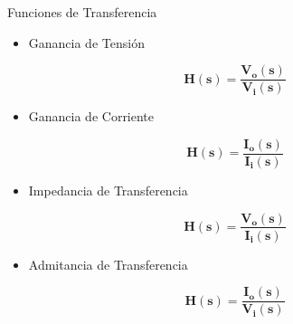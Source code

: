 \documentclass[xcolor={usenames,svgnames,dvipsnames}]{beamer}
\newcommand{\laplace}[1]{\mathbf{#1}(\mathbf{s})}
\begin{document}
\begin{frame}[label={sec:org2cf626e}]{Funciones de Transferencia}
\begin{itemize}
\item Ganancia de Tensión
\end{itemize}
\[
\laplace{H} =\frac{\laplace{V_o}}{\laplace{V_i}}
\]
\begin{itemize}
\item Ganancia de Corriente
\end{itemize}
\[
\laplace{H} =\frac{\laplace{I_o}}{\laplace{I_i}}
\]
\begin{itemize}
\item Impedancia de Transferencia
\end{itemize}
\[
\laplace{H} =\frac{\laplace{V_o}}{\laplace{I_i}}
\]
\begin{itemize}
\item Admitancia de Transferencia
\end{itemize}
\[
\laplace{H} =\frac{\laplace{I_o}}{\laplace{V_i}}
\]
\end{frame}
\end{document}
